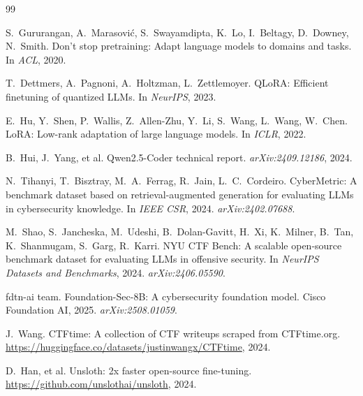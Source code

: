 \documentclass[10pt,twocolumn,a4paper]{ltjsarticle}
\begin{document}

\begin{thebibliography}{99}

S.~Gururangan, A.~Marasovi\'c, S.~Swayamdipta, K.~Lo, I.~Beltagy, D.~Downey, N.~Smith.
\newblock Don't stop pretraining: Adapt language models to domains and tasks.
\newblock In \emph{ACL}, 2020.

T.~Dettmers, A.~Pagnoni, A.~Holtzman, L.~Zettlemoyer.
\newblock QLoRA: Efficient finetuning of quantized LLMs.
\newblock In \emph{NeurIPS}, 2023.

E.~Hu, Y.~Shen, P.~Wallis, Z.~Allen-Zhu, Y.~Li, S.~Wang, L.~Wang, W.~Chen.
\newblock LoRA: Low-rank adaptation of large language models.
\newblock In \emph{ICLR}, 2022.

B.~Hui, J.~Yang, et al.
\newblock Qwen2.5-Coder technical report.
\newblock \emph{arXiv:2409.12186}, 2024.

N.~Tihanyi, T.~Bisztray, M.~A.~Ferrag, R.~Jain, L.~C.~Cordeiro.
\newblock CyberMetric: A benchmark dataset based on retrieval-augmented generation for evaluating LLMs in cybersecurity knowledge.
\newblock In \emph{IEEE CSR}, 2024. \emph{arXiv:2402.07688}.

M.~Shao, S.~Jancheska, M.~Udeshi, B.~Dolan-Gavitt, H.~Xi, K.~Milner, B.~Tan, K.~Shanmugam, S.~Garg, R.~Karri.
\newblock NYU CTF Bench: A scalable open-source benchmark dataset for evaluating LLMs in offensive security.
\newblock In \emph{NeurIPS Datasets and Benchmarks}, 2024. \emph{arXiv:2406.05590}.

fdtn-ai team.
\newblock Foundation-Sec-8B: A cybersecurity foundation model.
\newblock Cisco Foundation AI, 2025. \emph{arXiv:2508.01059}.

J.~Wang.
\newblock CTFtime: A collection of CTF writeups scraped from CTFtime.org.
\newblock \url{https://huggingface.co/datasets/justinwangx/CTFtime}, 2024.

D.~Han, et al.
\newblock Unsloth: 2x faster open-source fine-tuning.
\newblock \url{https://github.com/unslothai/unsloth}, 2024.

\end{thebibliography}
\end{document}

